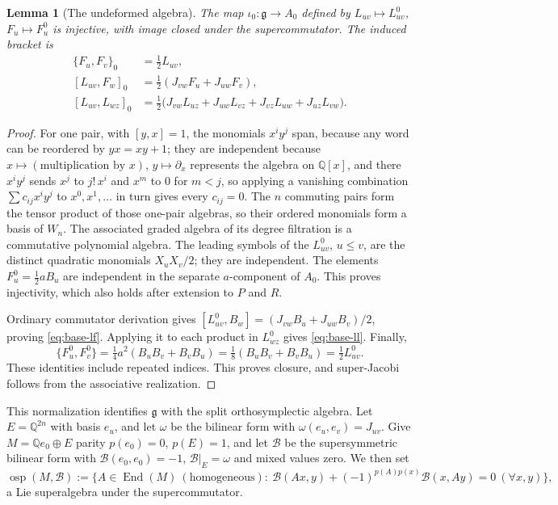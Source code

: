 \documentclass[11pt]{article}
\numberwithin{equation}{section}
\newtheorem{lemma}[theorem]{Lemma}
\theoremstyle{remark}
\begin{document}
\begin{lemma}[The undeformed algebra]\label{lem:base}
The map $\iota_0:\mathfrak g\to A_0$ defined by
$L_{uv}\mapsto L^0_{uv}$, $F_u\mapsto F^0_u$ is injective, with image closed
under the supercommutator. The induced bracket is
\begin{align}
 \{F_u,F_v\}_0&=\tfrac{1}{2} L_{uv},\label{eq:base-ff}\\
 [L_{uv},F_w]_0&=\tfrac{1}{2}(J_{vw}F_u+J_{uw}F_v),\label{eq:base-lf}\\
 [L_{uv},L_{wz}]_0&=\tfrac{1}{2}\bigl(
 J_{vw}L_{uz}+J_{uw}L_{vz}
 +J_{vz}L_{uw}+J_{uz}L_{vw}\bigr).\label{eq:base-ll}
\end{align}
\end{lemma}
\begin{proof}
For one pair, with $[y,x]=1$, the monomials $x^iy^j$ span, because any
word can be reordered by $yx=xy+1$; they are independent because
$x\mapsto(\text{multiplication by }x)$, $y\mapsto\partial_x$ represents the
algebra on $\mathbb Q[x]$, and there $x^iy^j$ sends $x^j$ to $j!\,x^i$
and $x^m$ to $0$ for $m<j$, so applying a vanishing combination
$\sum c_{ij}x^iy^j$ to $x^0,x^1,\ldots$ in turn gives every $c_{ij}=0$.
The $n$ commuting pairs form the tensor product of those one-pair algebras,
so their ordered monomials form a basis of $W_n$. The associated graded algebra
of its degree filtration is a commutative polynomial algebra. The leading
symbols of the
$L^0_{uv}$, $u\leq v$, are the distinct quadratic monomials
$X_uX_v/2$; they are independent. The elements $F^0_u=\tfrac{1}{2}aB_u$ are independent
in the separate $a$-component of $A_0$. This proves injectivity,
which also holds after extension to $P$ and $R$.

Ordinary commutator derivation gives
$[L^0_{uv},B_w]=(J_{vw}B_u+J_{uw}B_v)/2$, proving
\eqref{eq:base-lf}. Applying it to each product in $L^0_{wz}$ gives
\eqref{eq:base-ll}. Finally,
\[
 \{F^0_u,F^0_v\}=\tfrac{1}{4}a^2(B_uB_v+B_vB_u)
 =\tfrac{1}{8}(B_uB_v+B_vB_u)=\tfrac{1}{2} L^0_{uv}.
\]
These identities include repeated indices. This proves closure, and
super-Jacobi follows from the associative realization.
\end{proof}

This normalization identifies $\mathfrak g$ with the split
orthosymplectic algebra. Let $E=\mathbb Q^{2n}$ with basis $e_u$, and let
$\omega$ be the bilinear form with $\omega(e_u,e_v)=J_{uv}$. Give
$M=\mathbb Qe_0\oplus E$ parity $p(e_0)=0$, $p(E)=1$, and let $\mathcal B$ be
the supersymmetric bilinear form with $\mathcal B(e_0,e_0)=-1$,
$\mathcal B|_E=\omega$ and mixed values zero.
We then set
\[
 \operatorname{osp}(M,\mathcal B):=\bigl\{A\in\operatorname{End}(M)\ (\text{homogeneous}):\
 \mathcal B(Ax,y)+(-1)^{p(A)p(x)}\mathcal B(x,Ay)=0\ (\forall x,y)\bigr\},
\]
a Lie superalgebra under the supercommutator.
\end{document}

